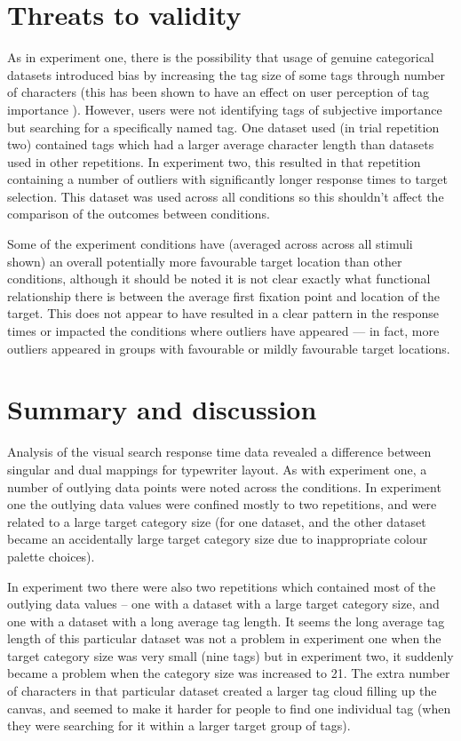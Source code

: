\section{Threats to validity}\label{sect:threatsexp2}

As in experiment one, there is the possibility that usage of genuine categorical datasets introduced bias by increasing the tag size of some tags through number of characters (this has been shown to have an effect on user perception of tag importance \citep{bateman08}). However, users were not identifying tags of subjective importance but searching for a specifically named tag. One dataset used (in trial repetition two) contained tags which had a larger average character length than datasets used in other repetitions. In experiment two, this resulted in that repetition containing a number of outliers with significantly longer response times to target selection. This dataset was used across all conditions so this shouldn't affect the comparison of the outcomes between conditions.

Some of the experiment conditions have (averaged across across all stimuli shown) an overall potentially more favourable target location than other conditions, although it should be noted it is not clear exactly what functional relationship there is between the average first fixation point and location of the target. This does not appear to have resulted in a clear pattern in the response times or impacted the conditions where outliers have appeared --- in fact, more outliers appeared in groups with favourable or mildly favourable target locations. 

\section{Summary and discussion}\label{sect:exp2summary}

Analysis of the visual search response time data revealed a difference between singular and dual mappings for typewriter layout. As with experiment one, a number of outlying data points were noted across the conditions. In experiment one the outlying data values were confined mostly to two repetitions, and were related to a large target category size (for one dataset, and the other dataset became an accidentally large target category size due to inappropriate colour palette choices).

In experiment two there were also two repetitions which contained most of the outlying data values -- one with a dataset with a large target category size, and one with a dataset with a long average tag length. It seems the long average tag length of this particular dataset was not a problem in experiment one when the target category size was very small (nine tags) but in experiment two, it suddenly became a problem when the category size was increased to 21. The extra number of characters in that particular dataset created a larger tag cloud filling up the canvas, and seemed to make it harder for people to find one individual tag (when they were searching for it within a larger target group of tags).

